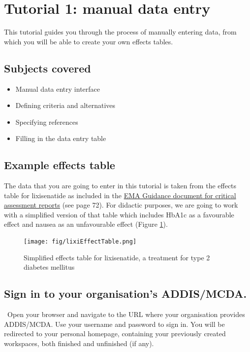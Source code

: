\documentclass[00_mcda_tutorial.tex]{subfiles}
\begin{document}
\section*{Tutorial 1: manual data entry}
\addtocounter{section}{1}

This tutorial guides you through the process of manually entering data, from which you will be able to create your own effects tables.

\subsection*{Subjects covered}
\begin{itemize}
    \item Manual data entry interface
    \item Defining criteria and alternatives
    \item Specifying references
    \item Filling in the data entry table
\end{itemize}

\subsection*{Example effects table}
The data that you are going to enter in this tutorial is taken from the effects table for lixisenatide as included in the \href{https://www.ema.europa.eu/documents/template-form/day-80-assessment-report-overview-d120-loq-template-guidance-rev-1019_en.docx}{EMA Guidance document for critical assessment reports} (see page 72).  For didactic purposes, we are going to work with a simplified version of that table which includes HbA1c as a favourable effect and nausea as an unfavourable effect (Figure \ref{fig:lixisenatide_effect_table}).

\begin{figure}[!ht]
    \centering
    \texttt{[image: fig/lixiEffectTable.png]}
    \caption{Simplified effects table for lixisenatide, a treatment for type 2 diabetes mellitus}
    \label{fig:lixisenatide_effect_table}
\end{figure}

\subsection*{Sign in to your organisation's ADDIS/MCDA.}
\leftpointright \, Open your browser and navigate to the URL where your organisation provides ADDIS/MCDA.
Use your username and password to sign in.
You will be redirected to your personal homepage, containing your previously created workspaces, both finished and unfinished (if any).
\end{document}
